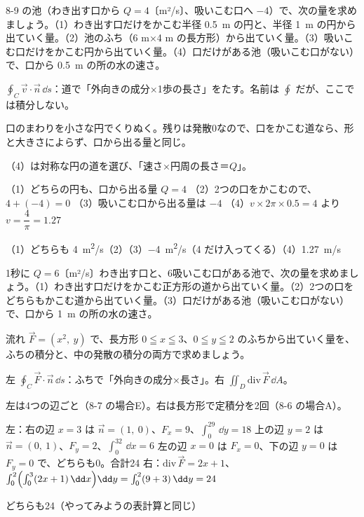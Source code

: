 \begin{reidai}
8-9 の池（わき出す口から $Q=4$〔m²/s〕、吸いこむ口へ $-4$）で、次の量を求めましょう。（1）わき出す口だけをかこむ半径 \qty{0.5}{m} の円と、半径 \qty{1}{m} の円から出ていく量。（2）池のふち（6 m×4 m の長方形）から出ていく量。（3）吸いこむ口だけをかこむ円から出ていく量。（4）口だけがある池（吸いこむ口がない）で、口から \qty{0.5}{m} の所の水の速さ。\par
\kangaekata {}\par
{}\enspace $\oint_C\vec v\cdot\vec n\,\dd s$：道で「外向きの成分×1歩の長さ」をたす。名前は $\oint$ だが、ここでは積分しない。\par
{}\enspace 口のまわりを小さな円でくりぬく。残りは発散0なので、口をかこむ道なら、形と大きさによらず、口から出る量と同じ。\par
{}\enspace（4）は対称な円の道を選び、「速さ×円周の長さ＝$Q$」。\par
\shiki（1）どちらの円も、口から出る量 $Q=4$\kviiilq
（2）2つの口をかこむので、$4+(-4)=0$\kviiilq
（3）吸いこむ口から出る量は $-4$\kviiilq
（4）$v\times2\pi\times0.5=4$ より $v=\dfrac{4}{\pi}=1.27$\par
\kotae（1）\nobreak どちらも \qty{4}{m^2/s}\quad（2）\quad（3）\nobreak \qty{-4}{m^2/s}（4 だけ入ってくる）\quad（4）\nobreak \qty{1.27}{m/s}
\end{reidai}

\begin{jibun}
1秒に $Q=6$〔m²/s〕わき出す口と、6吸いこむ口がある池で、次の量を求めましょう。（1）わき出す口だけをかこむ正方形の道から出ていく量。（2）2つの口をどちらもかこむ道から出ていく量。（3）口だけがある池（吸いこむ口がない）で、口から \qty{1}{m} の所の水の速さ。
\end{jibun}

\begin{reidai}[平面のガウスの定理]
流れ $\vec F=(x^2,\ y)$ で、長方形 $0\leqq x\leqq3$、$0\leqq y\leqq2$ のふちから出ていく量を、ふちの積分と、中の発散の積分の両方で求めましょう。\par
\kangaekata {}\par
{}\enspace 左 $\oint_C\vec F\cdot\vec n\,\dd s$：ふちで「外向きの成分×長さ」。右 $\iint_D\mathrm{div}\,\vec F\,\dd A$。\par
{}\enspace 左は4つの辺ごと（8-7 の場合E）。右は長方形で定積分を2回（8-6 の場合A）。\par
\shiki 左：右の辺 $x=3$ は $\vec n=(1,\ 0)$、$F_x=9$、$\int_0^29\,\dd y=18$\kviiilq
上の辺 $y=2$ は $\vec n=(0,\ 1)$、$F_y=2$、$\int_0^32\,\dd x=6$\kviiilq
左の辺 $x=0$ は $F_x=0$、下の辺 $y=0$ は $F_y=0$ で、どちらも0。合計24\kviiilq
右：$\mathrm{div}\,\vec F=2x+1$、$\int_0^2\Bigl(\int_0^3(2x+1)\,\dd x\Bigr)\dd y=\int_0^2(9+3)\,\dd y=24$\par
\kotae どちらも24（やってみようの表計算と同じ）
\end{reidai}

